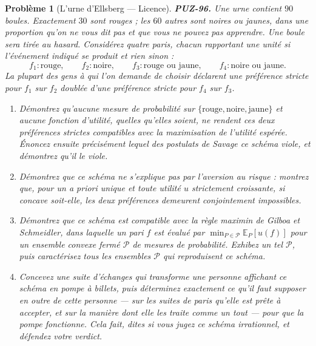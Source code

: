 \documentclass[11pt]{article}
\newtheorem{problem}{Problème}
\begin{document}
\begin{problem}[{L'urne d'Ellsberg --- Licence}]
\textbf{PUZ-96.} Une urne contient $ 90 $ boules. Exactement $ 30 $ sont rouges ; les
$ 60 $ autres sont noires ou jaunes, dans une proportion qu'on ne vous dit pas et que vous
ne pouvez pas apprendre. Une boule sera tirée au hasard. Considérez quatre paris, chacun
rapportant une unité si l'événement indiqué se produit et rien sinon :
\[ f_1 : \text{rouge}, \qquad f_2 : \text{noire}, \qquad f_3 : \text{rouge ou jaune}, \qquad f_4 : \text{noire ou jaune}. \]
La plupart des gens à qui l'on demande de choisir déclarent une préférence stricte pour
$ f_1 $ sur $ f_2 $ doublée d'une préférence stricte pour $ f_4 $ sur $ f_3 $.
\begin{enumerate}
\item[(a)] Démontrez qu'aucune mesure de probabilité sur
$ \{\text{rouge}, \text{noire}, \text{jaune}\} $ et aucune fonction d'utilité, quelles
qu'elles soient, ne rendent ces deux préférences strictes compatibles avec la maximisation de
l'utilité espérée. Énoncez ensuite précisément lequel des postulats de Savage ce schéma
viole, et démontrez qu'il le viole.
\item[(b)] Démontrez que ce schéma ne s'explique pas par l'aversion au risque : montrez que, pour
un a priori unique et \textit{toute} utilité $ u $ strictement croissante, si concave
soit-elle, les deux préférences demeurent conjointement impossibles.
\item[(c)] Démontrez que ce schéma est compatible avec la règle maximin de Gilboa et Schmeidler,
dans laquelle un pari $ f $ est évalué par
$ \min_{P \in \mathcal{P}} \mathbb{E}_{P}[u(f)] $ pour un ensemble convexe fermé
$ \mathcal{P} $ de mesures de probabilité. Exhibez un tel $ \mathcal{P} $, puis
caractérisez tous les ensembles $ \mathcal{P} $ qui reproduisent ce schéma.
\item[(d)] Concevez une suite d'échanges qui transforme une personne affichant ce schéma en pompe à
billets, puis déterminez exactement ce qu'il faut supposer en outre de cette personne --- sur
les suites de paris qu'elle est prête à accepter, et sur la manière dont elle les traite
comme un tout --- pour que la pompe fonctionne. Cela fait, dites si vous jugez ce schéma
irrationnel, et défendez votre verdict.
\end{enumerate}

\end{problem}
\end{document}
